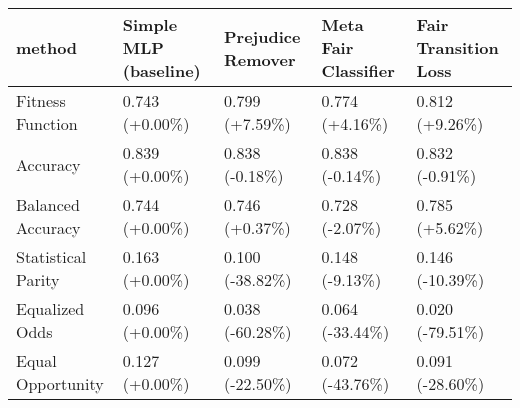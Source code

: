 \begin{tabular}{lllll}
\toprule
method & Simple MLP (baseline) & Prejudice Remover & Meta Fair Classifier & Fair Transition Loss \\
\midrule
Fitness Function   &        0.743 (+0.00\%) &    0.799 (+7.59\%) &       0.774 (+4.16\%) &       0.812 (+9.26\%) \\
Accuracy           &        0.839 (+0.00\%) &    0.838 (-0.18\%) &       0.838 (-0.14\%) &       0.832 (-0.91\%) \\
Balanced Accuracy  &        0.744 (+0.00\%) &    0.746 (+0.37\%) &       0.728 (-2.07\%) &       0.785 (+5.62\%) \\
Statistical Parity &        0.163 (+0.00\%) &   0.100 (-38.82\%) &       0.148 (-9.13\%) &      0.146 (-10.39\%) \\
Equalized Odds     &        0.096 (+0.00\%) &   0.038 (-60.28\%) &      0.064 (-33.44\%) &      0.020 (-79.51\%) \\
Equal Opportunity  &        0.127 (+0.00\%) &   0.099 (-22.50\%) &      0.072 (-43.76\%) &      0.091 (-28.60\%) \\
\bottomrule
\end{tabular}
